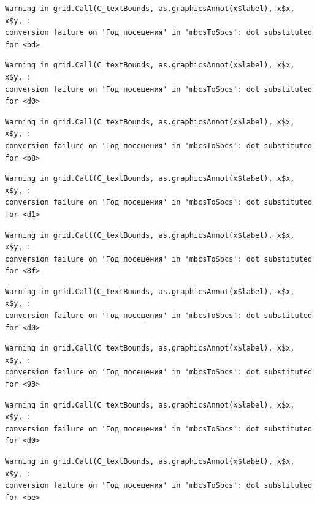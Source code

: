 \documentclass[
  letterpaper,
  DIV=11,
  numbers=noendperiod]{scrartcl}
\begin{document}
\begin{verbatim}
Warning in grid.Call(C_textBounds, as.graphicsAnnot(x$label), x$x, x$y, :
conversion failure on 'Год посещения' in 'mbcsToSbcs': dot substituted for <bd>
\end{verbatim}

\begin{verbatim}
Warning in grid.Call(C_textBounds, as.graphicsAnnot(x$label), x$x, x$y, :
conversion failure on 'Год посещения' in 'mbcsToSbcs': dot substituted for <d0>
\end{verbatim}

\begin{verbatim}
Warning in grid.Call(C_textBounds, as.graphicsAnnot(x$label), x$x, x$y, :
conversion failure on 'Год посещения' in 'mbcsToSbcs': dot substituted for <b8>
\end{verbatim}

\begin{verbatim}
Warning in grid.Call(C_textBounds, as.graphicsAnnot(x$label), x$x, x$y, :
conversion failure on 'Год посещения' in 'mbcsToSbcs': dot substituted for <d1>
\end{verbatim}

\begin{verbatim}
Warning in grid.Call(C_textBounds, as.graphicsAnnot(x$label), x$x, x$y, :
conversion failure on 'Год посещения' in 'mbcsToSbcs': dot substituted for <8f>
\end{verbatim}

\begin{verbatim}
Warning in grid.Call(C_textBounds, as.graphicsAnnot(x$label), x$x, x$y, :
conversion failure on 'Год посещения' in 'mbcsToSbcs': dot substituted for <d0>
\end{verbatim}

\begin{verbatim}
Warning in grid.Call(C_textBounds, as.graphicsAnnot(x$label), x$x, x$y, :
conversion failure on 'Год посещения' in 'mbcsToSbcs': dot substituted for <93>
\end{verbatim}

\begin{verbatim}
Warning in grid.Call(C_textBounds, as.graphicsAnnot(x$label), x$x, x$y, :
conversion failure on 'Год посещения' in 'mbcsToSbcs': dot substituted for <d0>
\end{verbatim}

\begin{verbatim}
Warning in grid.Call(C_textBounds, as.graphicsAnnot(x$label), x$x, x$y, :
conversion failure on 'Год посещения' in 'mbcsToSbcs': dot substituted for <be>
\end{verbatim}
\end{document}

